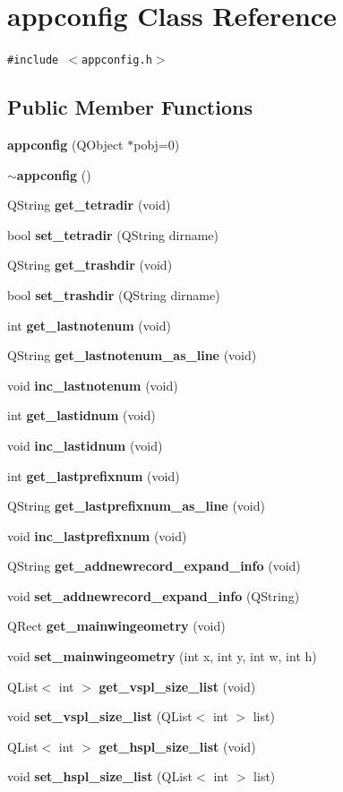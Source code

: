 \section{appconfig Class Reference}
\label{classappconfig}
{\tt \#include $<$appconfig.h$>$}

\subsection*{Public Member Functions}
\begin{CompactItemize}
\item 
{\bf appconfig} (QObject $\ast$pobj=0)
\item 
{\bf $\sim$appconfig} ()
\item 
QString {\bf get\_\-tetradir} (void)
\item 
bool {\bf set\_\-tetradir} (QString dirname)
\item 
QString {\bf get\_\-trashdir} (void)
\item 
bool {\bf set\_\-trashdir} (QString dirname)
\item 
int {\bf get\_\-lastnotenum} (void)
\item 
QString {\bf get\_\-lastnotenum\_\-as\_\-line} (void)
\item 
void {\bf inc\_\-lastnotenum} (void)
\item 
int {\bf get\_\-lastidnum} (void)
\item 
void {\bf inc\_\-lastidnum} (void)
\item 
int {\bf get\_\-lastprefixnum} (void)
\item 
QString {\bf get\_\-lastprefixnum\_\-as\_\-line} (void)
\item 
void {\bf inc\_\-lastprefixnum} (void)
\item 
QString {\bf get\_\-addnewrecord\_\-expand\_\-info} (void)
\item 
void {\bf set\_\-addnewrecord\_\-expand\_\-info} (QString)
\item 
QRect {\bf get\_\-mainwingeometry} (void)
\item 
void {\bf set\_\-mainwingeometry} (int x, int y, int w, int h)
\item 
QList$<$ int $>$ {\bf get\_\-vspl\_\-size\_\-list} (void)
\item 
void {\bf set\_\-vspl\_\-size\_\-list} (QList$<$ int $>$ list)
\item 
QList$<$ int $>$ {\bf get\_\-hspl\_\-size\_\-list} (void)
\item 
void {\bf set\_\-hspl\_\-size\_\-list} (QList$<$ int $>$ list)

\end{CompactItemize}
